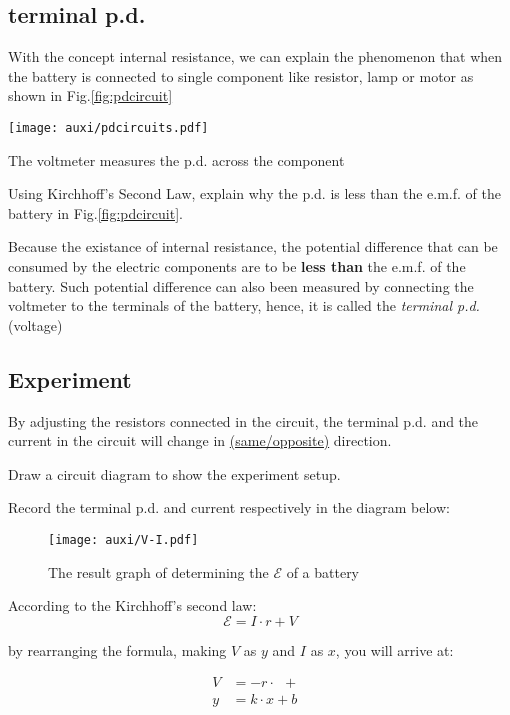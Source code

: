 \documentclass[a4paper]{tufte-handout}
\newenvironment{TaskBox} %
{\begin{tcolorbox}[breakable,colback=b1!30,colframe=b1,title=Task]} {\end{tcolorbox}}
\newenvironment{SummBox}
{\begin{tcolorbox}[breakable,colback=r1!30,colframe=r1,title=Summary]} {\end{tcolorbox}}
\begin{document}
\subsection{terminal p.d.}
With the concept internal resistance, we can explain the phenomenon that when the battery is connected to single component like resistor, lamp or motor as shown in Fig.\ref{fig:pdcircuit}
\begin{marginfigure}
\centering
\texttt{[image: auxi/pdcircuits.pdf]}
\caption{The voltmeter measures the p.d. across the component}
\label{fig:pdcircuit}
\end{marginfigure}
\begin{TaskBox}
Using Kirchhoff's Second Law, explain why the p.d. is less than the e.m.f. of the battery in Fig.\ref{fig:pdcircuit}.
\vspace{1in}
\end{TaskBox}
Because the existance of internal resistance, the potential difference that can be consumed by the electric components are to be 
\textbf{less than} the e.m.f. of the battery. Such potential difference can also been measured by connecting the voltmeter to the terminals of the battery, hence, it is called the \emph{terminal p.d. }(voltage)

\subsection{Experiment}
By adjusting the resistors connected in the circuit, the terminal p.d. and the current in the circuit will change in \uline{\hspace{1.5in}(same/opposite)} direction. 
\begin{TaskBox}
Draw a circuit diagram to show the experiment setup.
\vspace{1in}  
\end{TaskBox}

Record the terminal p.d. and current respectively in the diagram below:
\begin{figure}[h]
\centering
\texttt{[image: auxi/V-I.pdf]}
\caption{The result graph of determining the $\mathcal{E}$ of a battery}
\end{figure}

According to the Kirchhoff's second law:
\[
  \mathcal{E} = I\cdot r + V
\]

by rearranging the formula, making $V$  as $y$ and $I$ as $x$, you will arrive at:
\begin{SummBox}
\begin{align*}
    V  &= -r\cdot \boxed{\phantom{I}} + \boxed{\phantom{\mathcal{E}}}\\
    y  &= k\cdot x+b
\end{align*}
\end{SummBox} 
\end{document}
